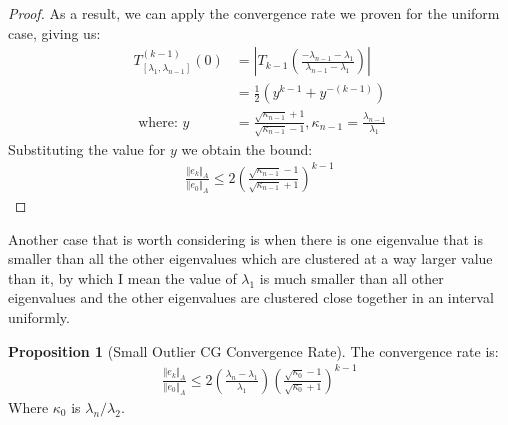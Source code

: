 \documentclass[]{article}
\theoremstyle{definition}
\newtheorem{prop}{Proposition}[section]  %
\begin{document}
\begin{proof}
                As a result, we can apply the convergence rate we proven for the uniform case, giving us: 
                \begin{align}
                    T^{(k - 1)}_{[\lambda_1, \lambda_{n - 1}]}
                    \left(
                        0
                    \right)
                    &= \left|
                        T_{k-1}\left(
                            \frac{
                                -\lambda_{n-1} - \lambda_1
                            }
                            {\lambda_{n-1}- \lambda_1}
                        \right)
                    \right|
                    \\ 
                    &=
                    \frac{1}{2}(y^{k - 1} + y^{-(k - 1)})
                    \\
                    \text{ where: } y &= \frac{\sqrt{\kappa_{n - 1}} + 1}{\sqrt{\kappa_{n - 1}} - 1}, \kappa_{n - 1} = \frac{\lambda_{n - 1}}{\lambda_1}
                \end{align}
                Substituting the value for $y$ we obtain the bound: 
                \begin{align}
                    \frac{\Vert e_k\Vert_A}{\Vert e_0\Vert_A} \le 
                    2\left(
                        \frac{\sqrt{\kappa_{n - 1}} - 1}{\sqrt{\kappa_{n - 1}} + 1}
                    \right)^{k - 1}
                \end{align}
            \end{proof}
            Another case that is worth considering is when there is one eigenvalue that is smaller than all the other eigenvalues which are clustered at a way larger value than it, by which I mean the value of $\lambda_1$ is much smaller than all other eigenvalues and the other eigenvalues are clustered close together in an interval uniformly. 
            \begin{prop}[Small Outlier CG Convergence Rate]
                The convergence rate is: 
                \begin{align}
                    \frac{\Vert e_k\Vert_A}{\Vert e_0\Vert_A} \le 
                    2\left(
                        \frac{\lambda_n - \lambda_1}{\lambda_1}
                    \right)
                    \left(
                        \frac{\sqrt{\kappa_0} - 1}{\sqrt{\kappa_0} + 1}
                    \right)^{k - 1}
                \end{align}
                Where $\kappa_0$ is $\lambda_n/\lambda_2$. 
            \end{prop}
\end{document}
